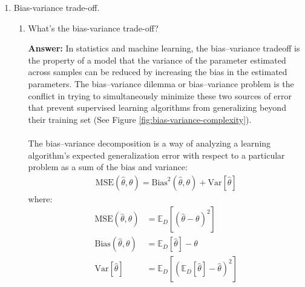 \documentclass{article}
\newenvironment{QandA}{\begin{enumerate}[label=\arabic*.]}{\end{enumerate}}
\newenvironment{InnerQandA}{\begin{enumerate}[label=\roman*.]}{\end{enumerate}}
\newenvironment{answer}{\par\normalfont \textbf{Answer:}}{}
\begin{document}
\begin{QandA}
    \item Bias-variance trade-off.
    \begin{InnerQandA}
        \item What’s the bias-variance trade-off?
        \begin{answer}
            In statistics and machine learning, the bias–variance tradeoff is the property of a model that the variance of the parameter estimated across samples can be reduced by increasing the bias in the estimated parameters. The bias–variance dilemma or bias–variance problem is the conflict in trying to simultaneously minimize these two sources of error that prevent supervised learning algorithms from generalizing beyond their training set (See Figure \ref{fig:bias-variance-complexity}).\\\\
            The bias–variance decomposition is a way of analyzing a learning algorithm's expected generalization error with respect to a particular problem as a sum of the bias and variance:
            \begin{align*}
                \text{MSE}\left(\hat{\theta}, \theta\right) = \text{Bias}^2\left(\hat{\theta}, \theta\right) + \text{Var}\left[ \hat{\theta} \right]
            \end{align*}
            where:
            \begin{align*}
                \text{MSE}\left(\hat{\theta}, \theta\right) &= \mathbb{E}_{D} \left[(\hat{\theta} - \theta)^2\right] \\
                \text{Bias}\left(\hat{\theta}, \theta \right) &= \mathbb{E}_{D}\left[\hat{\theta}\right] - \theta \\
                \text{Var}\left[\hat{\theta}\right] &= \mathbb{E}_{D} \left[ \left( \mathbb{E}_{D}\left[ \hat{\theta} \right] - \hat{\theta} \right)^2 \right]
            \end{align*}


\end{answer}
\end{InnerQandA}
\end{QandA}
\end{document}
